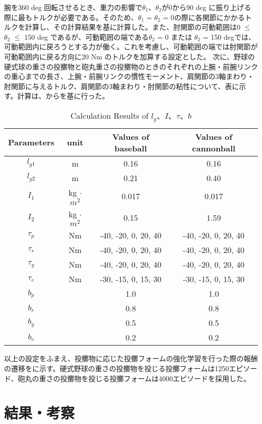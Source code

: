 腕を360 deg 回転させるとき、重力の影響で$\theta_{1}$、$\theta_{2}$が0から90 deg に振り上げる際に最もトルクが必要である。そのため、$\theta_{1}$ = $\theta_{2}$ = 0の際に各関節にかかるトルクを計算し、その計算結果を基に計算した。また、肘関節の可動範囲は0 $\le$ $\theta_{2}$ $\le$ 150 deg であるが、可動範囲の端である$\theta_{2}$ = 0 または $\theta_{2}$ = 150 degでは、可動範囲内に戻ろうとする力が働く。これを考慮し、可動範囲の端では肘関節が可動範囲内に戻る方向に20 Nm のトルクを加算する設定とした。
次に、野球の硬式球の重さの投擲物と砲丸重さの投擲物のときのそれぞれの上腕・前腕リンクの重心までの長さ、上腕・前腕リンクの慣性モーメント、肩関節の3軸まわり・肘関節に与えるトルク、肩関節の3軸まわり・肘関節の粘性について、表に示す。計算は、からを基に行った。
\begin{table}[tb]
  \begin{center}
    \caption{Calculation Results of $l_{g}$、$I$、$\tau$、$b$}

    \begin{tabular}{c|c|c|c}
      \hline
      Parameters & unit & Values of baseball & Values of cannonball \\
      \hline
      $l_{g1}$ & m & 0.16 & 0.16 \\
      $l_{g2}$ & m & 0.21 & 0.40 \\
      $I_{1}$ & kg $\cdot$ ${m}^2$ & 0.017 & 0.017 \\
      $I_{2}$ & kg $\cdot$ ${m}^2$ & 0.15 & 1.59 \\
      $\tau_{p}$ & Nm & -40, -20, 0, 20, 40 & -40, -20, 0, 20, 40 \\
      $\tau_{r}$ & Nm & -40, -20, 0, 20, 40 & -40, -20, 0, 20, 40 \\
      $\tau_{y}$ & Nm & -40, -20, 0, 20, 40 & -40, -20, 0, 20, 40 \\
      $\tau_{e}$ & Nm & -30, -15, 0, 15, 30 & -30, -15, 0, 15, 30 \\
      $b_{p}$ &  & 1.0 & 1.0\\
      $b_{r}$ &  & 0.8 & 0.8\\
      $b_{y}$ &  & 0.5 & 0.5\\
      $b_{e}$ &  & 0.2 & 0.2\\
      \hline
    \end{tabular}
  \end{center}
\end{table}

以上の設定をふまえ、投擲物に応じた投擲フォームの強化学習を行った際の報酬の遷移をに示す。硬式野球の重さの投擲物を投じる投擲フォームは1250エピソード、砲丸の重さの投擲物を投じる投擲フォームは4000エピソードを採用した。

\section{結果・考察}
